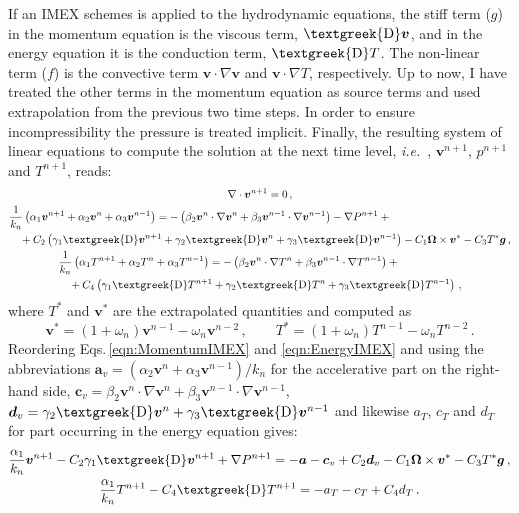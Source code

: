 \documentclass[review]{revtex4-1}
\newcommand{\ie}{\textit{i.e.}\ }
\newcommand{\laplace}{\text{\textgreek{D}}}
\begin{document}
If an IMEX schemes is applied to the hydrodynamic equations, the stiff term ($g$) in the momentum equation is the viscous term, $\laplace\bm{v}$, and in the energy equation it is the conduction term, $\laplace T$. The non-linear  term ($f$) is the convective term $\bm{v}\cdot\nabla\bm{v}$ and $\bm{v}\cdot\nabla T$, respectively. Up to now, I have treated the other terms in the momentum equation as source terms and used extrapolation from the previous two time steps. In order to ensure incompressibility the pressure is treated implicit. Finally, the resulting system of linear equations to compute the solution at the next time level, \ie, $\bm{v}^{n+1}$, $p^{n+1}$ and $T^{n+1}$, reads:
\begin{gather}
	\nabla\cdot\bm{v}^{n+1}=0\,,\\
	\begin{multlined}[c]
		\frac{1}{k_n}\left(\alpha_1 \bm{v}^{n+1}+ \alpha_2 \bm{v}^{n}+\alpha_3 \bm{v}^{n-1}\right)=-\left(\beta_2\bm{v}^{n}\cdot\nabla\bm{v}^{n}+\beta_3\bm{v}^{n-1}\cdot\nabla\bm{v}^{n-1}\right)-\nabla P^{n+1}+{}\\
		+C_2\left(\gamma_1\laplace\bm{v}^{n+1}+\gamma_2\laplace\bm{v}^{n}+\gamma_3\laplace\bm{v}^{n-1}\right)-C_1\bm{\Omega}\times\bm{v}^*-C_3T^*\bm{g}\,,
	\end{multlined}\label{eqn:MomentumIMEX}\\
	\begin{multlined}[c]
		\frac{1}{k_n}\left(\alpha_1 T^{n+1}+ \alpha_2 T^{n}+\alpha_3 T^{n-1}\right)=-\left(\beta_2\bm{v}^{n}\cdot\nabla T^{n}+\beta_3\bm{v}^{n-1}\cdot\nabla T^{n-1}\right)+{}\\
		+C_4\left(\gamma_1\laplace T^{n+1}+\gamma_2\laplace T^{n}+\gamma_3\laplace T^{n-1}\right)\,,
	\end{multlined}\label{eqn:EnergyIMEX}
\end{gather}
where $T^*$ and $\bm{v}^*$ are the extrapolated quantities and computed as
\begin{equation}
	\bm{v}^*=\left(1+\omega_n\right)\bm{v}^{n-1}-\omega_n\bm{v}^{n-2}\,,\qquad
	T^*=\left(1+\omega_n\right)T^{n-1}-\omega_nT^{n-2}\,.
\end{equation}
Reordering Eqs.\,\eqref{eqn:MomentumIMEX} and \eqref{eqn:EnergyIMEX} and using the abbreviations $\bm{a}_v=(\alpha_2 \bm{v}^{n}+\alpha_3 \bm{v}^{n-1})/k_n$ for the accelerative part on the right-hand side, $\bm{c}_v=\beta_2\bm{v}^{n}\cdot\nabla\bm{v}^{n}+\beta_3\bm{v}^{n-1}\cdot\nabla\bm{v}^{n-1}$, $\bm{d}_v=\gamma_2\laplace\bm{v}^{n}+\gamma_3\laplace\bm{v}^{n-1}$ and likewise $a_T$, $c_T$ and $d_T$ for part occurring in the energy equation gives:
\begin{gather}
	\frac{\alpha_1}{k_n}\bm{v}^{n+1}-C_2\gamma_1\laplace\bm{v}^{n+1}+\nabla P^{n+1}=-\bm{a}-\bm{c}_v+C_2\bm{d}_v-C_1\bm{\Omega}\times\bm{v}^*-C_3T^*\bm{g}\,,\label{eqn:MomentumIMEXReorder}\\
	\frac{\alpha_1}{k_n}T^{n+1}-C_4\laplace T^{n+1}=-a_T-c_T+C_4d_T\,.
	\label{eqn:EnergyIMEXReorder}
\end{gather}
\end{document}
